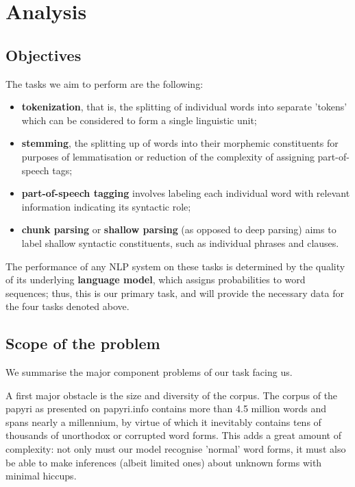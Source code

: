 
\chapter{Analysis}
\label{chp:analysis}

\section{Objectives}
The tasks we aim to perform are the following: 

\begin{itemize}
\item \textbf{tokenization}, that is, the splitting of individual
  words into separate 'tokens' which can be considered to form a single
  linguistic unit;
\item \textbf{stemming}, the splitting up of words into their morphemic
  constituents for purposes of lemmatisation or reduction of the
  complexity of assigning part-of-speech tags;
\item \textbf{part-of-speech tagging} involves labeling each
  individual word with relevant information indicating its syntactic
  role;
\item \textbf{chunk parsing} or \textbf{shallow parsing} (as opposed to deep parsing)
  aims to label shallow syntactic constituents, such as individual
  phrases and clauses.
\end{itemize}

The performance of any NLP system on these tasks is determined by the
quality of its underlying \textbf{language model}, which assigns
probabilities to word sequences; thus, this is our primary task, and
will provide the necessary data for the four tasks denoted above.

\section{Scope of the problem}
We summarise the major component problems of our task facing us.

A first major obstacle is the size and diversity of the corpus. The
corpus of the papyri as presented on papyri.info contains more than
4.5 million words and spans nearly a millennium, by virtue of which it
inevitably contains tens of thousands of unorthodox or corrupted word
forms.  This adds a great amount of complexity: not only must our
model recognise 'normal' word forms, it must also be able to make
inferences (albeit limited ones) about unknown forms with minimal hiccups.

